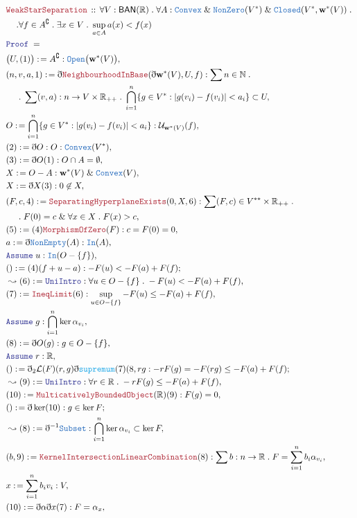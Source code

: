 \documentclass[12pt]{scrartcl}
\newcommand{\TYPE}[1]{\textcolor{NavyBlue}{\mathtt{#1}}}
\newcommand{\FUNC}[1]{\textcolor{Cerulean}{\mathtt{#1}}}
\newcommand{\LOGIC}[1]{\textcolor{Blue}{\mathtt{#1}}}
\newcommand{\THM}[1]{\textcolor{Maroon}{\mathtt{#1}}}
\renewcommand{\.}{\; . \;}
\newcommand{\de}{: \kern 0.1pc =}
\newcommand{\Theorem}[2]{& \THM{#1} \, :: \, #2 \\ & \Proof = \\ }
\newcommand{\NewLine}{\\ & \kern 1pc}
\newcommand{\Page}[1]{\begin{align*} #1 \end{align*} \newpage   }
\newcommand{ \bd }{ \ByDef }
\renewcommand{\And}{\; \& \;}
\newcommand{\Reals}{\mathbb{R} }
\newcommand{\Nat}{\mathbb{N} }
\renewcommand{\c}{\complement}
\newcommand{\Say}[3]{& #1 \de #2 : #3, \\}
\newcommand{\Conclude}[3]{& #1 \de #2 : #3; \\}
\newcommand{\Derive}[3]{& \leadsto #1 \de #2 : #3, \\}
\newcommand{\A}{\LOGIC{Assume} \;}
\newcommand{\Assume}[2]{& \A #1 : #2, \\}
\newcommand{\ByDef}{\eth}
\newcommand{\Proof}{\LOGIC{Proof} \; }
\newcommand{\BAN}{\textsf{BAN}}
\begin{document}
\Page{
  \Theorem{WeakStarSeparation}{ \forall V : \BAN(\Reals) \. \forall A  : \TYPE{Convex} \And \TYPE{NonZero}(V^*) \And \TYPE{Closed}(V^*,\mathbf{w}^*(V)) \.   \NewLine  
  . \forall f \in A^\c \. \exists x \in V \.  \sup_{a \in A} a(x) <  f(x)
  }
\Say{\big(U,(1)\big)}{  A^\c}{\TYPE{Open}\big(\mathbf{w}^*(V)\big)}
\Say{(n,v,a,1)}{ \bd \THM{NeighbourhoodInBase}( \bd \mathbf{w}^*(V), U, f)}{ \sum n \in \Nat \. 
\NewLine 
\.
\sum (v,a) : n \to V \times \Reals_{++} \.  \bigcap^n_{i = 1} \{  g \in V^* : |g(v_i) - f(v_i) | < a_i \} \subset U }
\Say{O}{\bigcap^n_{i = 1} \{  g \in V^* : |g(v_i) - f(v_i) | < a_i \}}{\mathcal{U}_{\mathbf{w}^*(V)}(f)}
\Say{(2)}{\bd O}{ O : \TYPE{Convex}(V^*)}
\Say{(3)}{\bd O(1)}{ O \cap A = \emptyset}
\Say{X}{O - A}{\mathbf{w}^*(V) \And \TYPE{Convex}(V)}
\Say{X}{\bd X (3)}{0 \not \in X}
\Say{(F,c,4)}{\THM{SeparatingHyperplaneExists}(0,X,6)}{\sum (F,c) \in V^{**} \times \Reals_{++} \. 
\NewLine
\. F(0) = c \And  \forall x \in X  \. F(x) > c}
\Say{(5)}{(4)\THM{MorphismOfZero}(F)}{c = F(0) = 0}
\Say{a}{\bd \TYPE{NonEmpty}(A)}{\TYPE{In}(A)}
\Assume{u}{\TYPE{In}(O - \{f\}) }
\Conclude{()}{(4)( f + u - a)}{  -F(u) <  -F(a) + F(f) }
\Derive{(6)}{\LOGIC{UniIntro}}{\forall u \in O - \{ f \} \.  -F(u) < -F(a) + F(f)  }
\Say{(7)}{\THM{IneqLimit}(6)}{ \sup_{u \in O - \{ f \}}  -F(u) \le -F(a) + F(f)}
\Assume{g}{ \bigcap^n_{i = 1} \ker \alpha_{v_i}}
\Say{(8)}{ \bd O(g)}{g \in O - \{f\} }
\Assume{r}{\Reals}
\Conclude{()}{\bd_2 \mathcal{L}(F)(r,g)\bd \FUNC{supremum}(7)(8,rg}{ -rF(g) = -F(rg) \le -F(a) + F(f) }
\Derive{(9)}{ \LOGIC{UniIntro}}{ \forall r \in \Reals \. -rF(g) \le -F(a)  + F(f) }
\Say{(10)}{\THM{MulticativelyBoundedObject}(\Reals)(9)}{F(g) = 0}
\Conclude{()}{\bd \ker (10)}{ g \in \ker F}
\Derive{(8)}{\bd^{-1} \TYPE{Subset}}{\bigcap^n_{i = 1} \ker \alpha_{v_i} \subset \ker F}
\Say{(b,9)}{\THM{KernelIntersectionLinearCombination}(8)}{\sum b : n \to \Reals \. F = \sum^n_{i = 1} b_i \alpha_{v_i} }
\Say{x}{\sum^n_{i = 1} b_i{v_i}}{V}
\Say{(10)}{\bd \alpha \bd x (7)}{F = \alpha_x}
}
\end{document}

